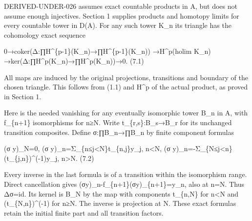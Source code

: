 DERIVED-UNDER-026 assumes exact countable products in A,\allowbreak{} but does not assume enough injectives. Section 1 supplies products and homotopy limits for every countable tower in D(A)\allowbreak{}. For any such tower K\_\allowbreak{}n its triangle has the cohomology exact sequence

\begingroup\raggedright
0\allowbreak{}→coker(Δ:\allowbreak{}∏H\textasciicircum{}\{p-1\}(K\_\allowbreak{}n)\allowbreak{}\allowbreak{}→∏H\textasciicircum{}\{p-1\}(K\_\allowbreak{}n)\allowbreak{})\allowbreak{} \allowbreak{}→H\textasciicircum{}p(holim K\_\allowbreak{}n)\allowbreak{} \allowbreak{}→ker(Δ:\allowbreak{}∏H\textasciicircum{}p(K\_\allowbreak{}n)\allowbreak{}\allowbreak{}→∏H\textasciicircum{}p(K\_\allowbreak{}n)\allowbreak{})\allowbreak{}\allowbreak{}→0. (7.1)\allowbreak{}
\par\endgroup

All maps are induced by the original projections,\allowbreak{} transitions and boundary of the chosen triangle. This follows from (1.1)\allowbreak{} and H\^{}p of the actual product,\allowbreak{} as proved in Section 1.

Here is the needed vanishing for any eventually isomorphic tower B\_\allowbreak{}n in A,\allowbreak{} with f\_\allowbreak{}\{n\allowbreak{}+1\} isomorphisms for n≥N. Write t\_\allowbreak{}\{r,\allowbreak{}s\}:\allowbreak{}B\_\allowbreak{}s\allowbreak{}→B\_\allowbreak{}r for its unchanged transition composites. Define σ:\allowbreak{}∏B\_\allowbreak{}n\allowbreak{}→∏B\_\allowbreak{}n by finite component formulas

(σ y)\allowbreak{}\_\allowbreak{}N\allowbreak{}=0,\allowbreak{} (σ y)\allowbreak{}\_\allowbreak{}n\allowbreak{}=Σ\_\allowbreak{}\{n≤j<N\}t\_\allowbreak{}\{n,\allowbreak{}j\}y\_\allowbreak{}j,\allowbreak{} n<N,\allowbreak{} (σ y)\allowbreak{}\_\allowbreak{}n\allowbreak{}=-Σ\_\allowbreak{}\{N≤j<n\}(t\_\allowbreak{}\{j,\allowbreak{}n\})\allowbreak{}\textasciicircum{}(-1)\allowbreak{}y\_\allowbreak{}j,\allowbreak{} n\textgreater N. (7.2)\allowbreak{}

Every inverse in the last formula is of a transition within the isomorphism range. Direct cancellation gives (σy)\allowbreak{}\_\allowbreak{}n-f\_\allowbreak{}\{n\allowbreak{}+1\}(σy)\allowbreak{}\_\allowbreak{}\{n\allowbreak{}+1\}\allowbreak{}=y\_\allowbreak{}n,\allowbreak{} also at n\allowbreak{}=N. Thus Δσ\allowbreak{}=id. Its kernel is B\_\allowbreak{}N by the map with components t\_\allowbreak{}\{n,\allowbreak{}N\} for n\textless N and (t\_\allowbreak{}\{N,\allowbreak{}n\})\allowbreak{}\textasciicircum{}(-1)\allowbreak{} for n≥N. The inverse is projection at N. These exact formulas retain the initial finite part and all transition factors.

